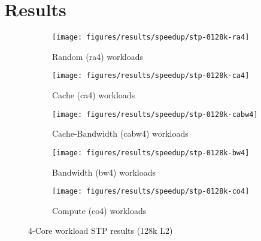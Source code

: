 
\chapter{Results}
\label{cpt:results}

\begin{figure}
    \centering
    \begin{subfigure}[b]{\textwidth}
            \texttt{[image: figures/results/speedup/stp-0128k-ra4]}
            \caption{Random (ra4) workloads}
            \label{fig:results:4core:stp:random}
    \end{subfigure}

    \begin{subfigure}[b]{0.5\textwidth}
            \texttt{[image: figures/results/speedup/stp-0128k-ca4]}
            \caption{Cache (ca4) workloads}
            \label{fig:results:4core:stp:cache}
    \end{subfigure}%
    \begin{subfigure}[b]{0.5\textwidth}
            \texttt{[image: figures/results/speedup/stp-0128k-cabw4]}
            \caption{Cache-Bandwidth (cabw4) workloads}
            \label{fig:results:4core:stp:cache-bw}
    \end{subfigure}

    \begin{subfigure}[b]{0.5\textwidth}
            \texttt{[image: figures/results/speedup/stp-0128k-bw4]}
            \caption{Bandwidth (bw4) workloads}
            \label{fig:results:4core:stp:bw}
    \end{subfigure}%
    \begin{subfigure}[b]{0.5\textwidth}
            \texttt{[image: figures/results/speedup/stp-0128k-co4]}
            \caption{Compute (co4) workloads}
            \label{fig:results:4core:stp:co}
    \end{subfigure}%

    \caption{4-Core workload STP results (128k L2)}\label{fig:results:4core:stp}
\end{figure}

